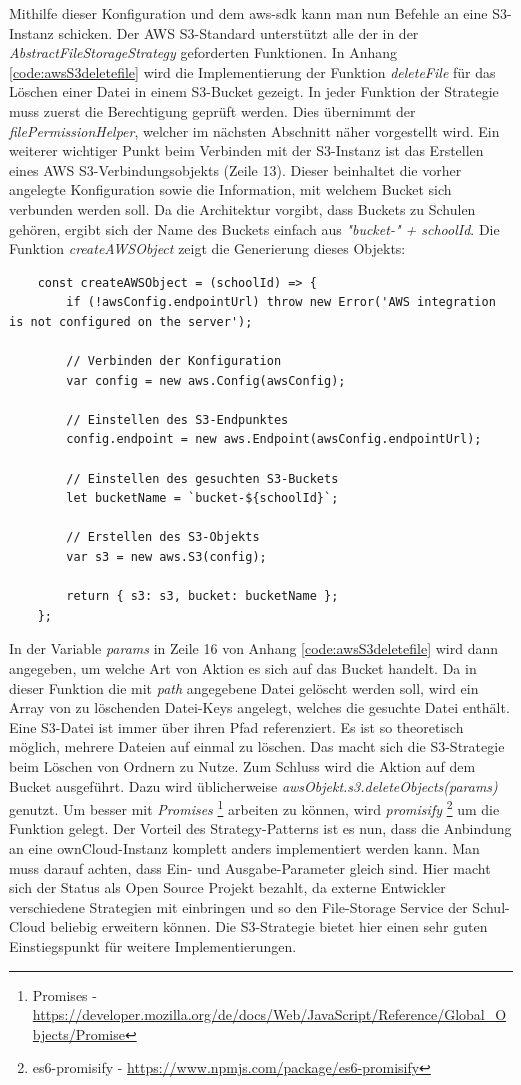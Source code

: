 Mithilfe dieser Konfiguration und dem aws-sdk kann man nun Befehle an eine S3-Instanz schicken. Der AWS S3-Standard unterstützt alle der in der \textit{AbstractFileStorageStrategy} geforderten Funktionen. In Anhang \ref{code:awsS3deletefile} wird die Implementierung der Funktion \textit{deleteFile} für das Löschen einer Datei in einem S3-Bucket gezeigt. In jeder Funktion der Strategie muss zuerst die Berechtigung geprüft werden. Dies übernimmt der \textit{filePermissionHelper}, welcher im nächsten Abschnitt näher vorgestellt wird. Ein weiterer wichtiger Punkt beim Verbinden mit der S3-Instanz ist das Erstellen eines AWS S3-Verbindungsobjekts (Zeile 13). Dieser beinhaltet die vorher angelegte Konfiguration sowie die Information, mit welchem Bucket sich verbunden werden soll. Da die Architektur vorgibt, dass Buckets zu Schulen gehören, ergibt sich der Name des Buckets einfach aus \textit{"bucket-" + schoolId}. Die Funktion \textit{createAWSObject} zeigt die Generierung dieses Objekts:

\begin{lstlisting}
	const createAWSObject = (schoolId) => {
		if (!awsConfig.endpointUrl) throw new Error('AWS integration is not configured on the server');
		
		// Verbinden der Konfiguration
		var config = new aws.Config(awsConfig);
		
		// Einstellen des S3-Endpunktes
		config.endpoint = new aws.Endpoint(awsConfig.endpointUrl);
		
		// Einstellen des gesuchten S3-Buckets
		let bucketName = `bucket-${schoolId}`;
		
		// Erstellen des S3-Objekts
		var s3 = new aws.S3(config);
		
		return { s3: s3, bucket: bucketName };
	};
\end{lstlisting}

In der Variable \textit{params} in Zeile 16 von Anhang \ref{code:awsS3deletefile} wird dann angegeben, um welche Art von Aktion es sich auf das Bucket handelt. Da in dieser Funktion die mit \textit{path} angegebene Datei gelöscht werden soll, wird ein Array von zu löschenden Datei-Keys angelegt, welches die gesuchte Datei enthält. Eine S3-Datei ist immer über ihren Pfad referenziert. Es ist so theoretisch möglich, mehrere Dateien auf einmal zu löschen. Das macht sich die S3-Strategie beim Löschen von Ordnern zu Nutze. Zum Schluss wird die Aktion auf dem Bucket ausgeführt. Dazu wird üblicherweise \textit{awsObjekt.s3.deleteObjects(params)} genutzt. Um besser mit \textit{Promises} \footnote{Promises - \url{https://developer.mozilla.org/de/docs/Web/JavaScript/Reference/Global_Objects/Promise}} arbeiten zu können, wird \textit{promisify} \footnote{es6-promisify - \url{https://www.npmjs.com/package/es6-promisify}} um die Funktion gelegt. Der Vorteil des Strategy-Patterns ist es nun, dass die Anbindung an eine ownCloud-Instanz komplett anders implementiert werden kann. Man muss darauf achten, dass Ein- und Ausgabe-Parameter gleich sind. Hier macht sich der Status als Open Source Projekt bezahlt, da externe Entwickler verschiedene Strategien mit einbringen und so den File-Storage Service der Schul-Cloud beliebig erweitern können. Die S3-Strategie bietet hier einen sehr guten Einstiegspunkt für weitere Implementierungen.

